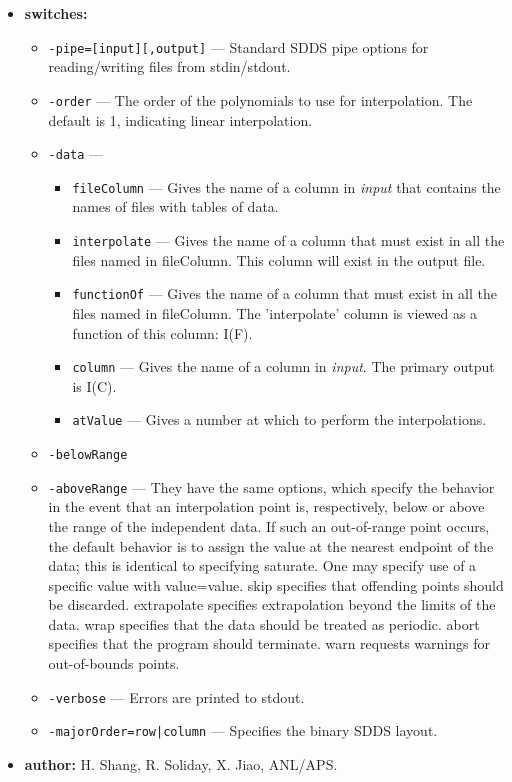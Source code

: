 \begin{itemize}
\item {\bf switches:} 
    \begin{itemize} 
    \item {\tt -pipe=[input][,output]} --- Standard SDDS pipe options for reading/writing files from stdin/stdout.
    \item {\tt -order} --- The order of the polynomials to use for interpolation. The default is 1, indicating linear interpolation.
    \item {\tt -data} --- 
      \begin{itemize} 
        \item {\tt fileColumn} --- Gives the name of a column in {\em input} that contains the names of files with tables of data.
        \item {\tt interpolate} --- Gives the name of a column that must exist in all the files named in fileColumn.  This column will exist in the output file.
        \item {\tt functionOf} --- Gives the name of a column that must exist in all the files named in fileColumn.  The 'interpolate' column is viewed as a function of this column:  I(F).
        \item {\tt column} --- Gives the name of a column in {\em input}.  The primary output is I(C).
        \item {\tt atValue} --- Gives a number at which to perform the interpolations.
      \end{itemize} 
    \item {\tt -belowRange}
    \item {\tt -aboveRange} --- They have the same options, which specify the behavior in the event that an interpolation point is, respectively, below or above the range of the independent data. If such an out-of-range point occurs, the default behavior is to assign the value at the nearest endpoint of the data; this is identical to specifying saturate. One may specify use of a specific value with value=value. skip specifies that offending points should be discarded. extrapolate specifies extrapolation beyond the limits of the data. wrap specifies that the data should be treated as periodic. abort specifies that the program should terminate. warn requests warnings for out-of-bounds points.
    \item {\tt -verbose} --- Errors are printed to stdout.
    \item {\tt -majorOrder=row|column} --- Specifies the binary SDDS layout.
    \end{itemize} 

\item {\bf author:} H. Shang, R. Soliday, X. Jiao, ANL/APS. 
\end{itemize} 
